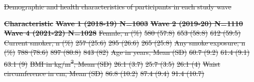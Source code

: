 \documentclass[
  letterpaper,
  DIV=11,
  numbers=noendperiod]{scrartcl}
\makeatletter
\renewenvironment{table}%
   {\renewcommand\familydefault\sfdefault
    \@float{table}}
   {\end@float}
\providecommand{\DIFadd}[1]{{\protect\color{blue}\underline{#1}}} %
\providecommand{\DIFdel}[1]{{\protect\color{red}\sout{#1}}}                      %
\providecommand{\DIFdelbegin}{} %
\providecommand{\DIFdelend}{} %
\providecommand{\DIFaddFL}[1]{\DIFadd{#1}} %
\providecommand{\DIFdelFL}[1]{\DIFdel{#1}} %
\providecommand{\DIFaddbeginFL}{} %
\providecommand{\DIFdelbeginFL}{} %
\providecommand{\DIFdelendFL}{} %
\newcommand{\DIFscaledelfig}{0.5}
\newlength{\DIFdelgraphicswidth} %
\newlength{\DIFdelgraphicsheight} %
\newcommand{\DIFaddincludegraphics}[2][]{{\color{blue}\fbox{\DIFOincludegraphics[#1]{#2}}}} %
\newcommand{\DIFdelincludegraphics}[2][]{%
\sbox{\DIFdelgraphicsbox}{\DIFOincludegraphics[#1]{#2}}%
\settoboxwidth{\DIFdelgraphicswidth}{\DIFdelgraphicsbox} %
\settoboxtotalheight{\DIFdelgraphicsheight}{\DIFdelgraphicsbox} %
\scalebox{\DIFscaledelfig}{%
\parbox[b]{\DIFdelgraphicswidth}{\usebox{\DIFdelgraphicsbox}\\[-\baselineskip] \rule{\DIFdelgraphicswidth}{0em}}\llap{\resizebox{\DIFdelgraphicswidth}{\DIFdelgraphicsheight}{%
\setlength{\unitlength}{\DIFdelgraphicswidth}%
\begin{picture}(1,1)%
\thicklines\linethickness{2pt} %
{\color[rgb]{1,0,0}\put(0,0){\framebox(1,1){}}}%
{\color[rgb]{1,0,0}\put(0,0){\line( 1,1){1}}}%
{\color[rgb]{1,0,0}\put(0,1){\line(1,-1){1}}}%
\end{picture}%
}\hspace*{3pt}}} %
} %
\DeclareRobustCommand{\DIFdelbegin}{\DIFOdelbegin \let\includegraphics\DIFdelincludegraphics} %
\DeclareRobustCommand{\DIFdelend}{\DIFOaddend \let\includegraphics\DIFOincludegraphics} %
\DeclareRobustCommand{\DIFaddbeginFL}{\DIFOaddbeginFL \let\includegraphics\DIFaddincludegraphics} %
\DeclareRobustCommand{\DIFdelbeginFL}{\DIFOdelbeginFL \let\includegraphics\DIFdelincludegraphics} %
\DeclareRobustCommand{\DIFdelendFL}{\DIFOaddendFL \let\includegraphics\DIFOincludegraphics} %
\makeatother
\begin{document}
\DIFdelbegin %
\DIFdelend \begin{table}
\DIFdelbeginFL %
{%
\DIFdelFL{Demographic and health characteristics of participants in each study
wave }}%
\DIFdelendFL 

\DIFdelbeginFL %
\textbf{\DIFdelFL{Characteristic}} %
\textbf{\DIFdelFL{Wave 1 (2018-19) N=1003}} %
\textbf{\DIFdelFL{Wave 2 (2019-20) N=1110}} %
\textbf{\DIFdelFL{Wave 4 (2021-22) N=1028}}%
\DIFdelFL{Female, n (\%) }%
\DIFdelFL{580 (57.8) }%
\DIFdelFL{653 (58.8) }%
\DIFdelFL{612 (59.5)}%
\DIFdelFL{Current smoker, n (\%) }%
\DIFdelFL{257 (25.6) }%
\DIFdelFL{295 (26.6) }%
\DIFdelFL{265 (25.8)}%
\DIFdelFL{Any smoke exposure, n (\%) }%
\DIFdelFL{788 (78.6) }%
\DIFdelFL{897 (80.8) }%
\DIFdelFL{843 (82)}%
\DIFdelFL{Age in years, Mean (SD) }%
\DIFdelFL{60.7 (9.2) }%
\DIFdelFL{61.4 (9.1) }%
\DIFdelFL{63.1 (9)}%
\DIFdelFL{BMI in kg/m\textsuperscript{2}, Mean (SD) }%
\DIFdelFL{26.1 (3.7) }%
\DIFdelFL{25.7 (3.5) }%
\DIFdelFL{26.1 (4)}%
\DIFdelFL{Waist circumference in cm, Mean (SD) }%
\DIFdelFL{86.8 (10.2) }%
\DIFdelFL{87.4 (9.4) }%
\DIFdelFL{91.4 (10.7)}%
\DIFdelendFL \DIFaddbeginFL \caption{\label{tbl-each-campaign}\DIFaddFL{Demographic and health characteristics
of participants in each study wave.}}


\end{table}
\end{document}
